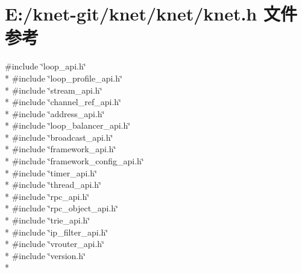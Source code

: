 \hypertarget{a00071}{}\section{E\+:/knet-\/git/knet/knet/knet.h 文件参考}
\label{a00071}
{\ttfamily \#include \char`\"{}loop\+\_\+api.\+h\char`\"{}}\\*
{\ttfamily \#include \char`\"{}loop\+\_\+profile\+\_\+api.\+h\char`\"{}}\\*
{\ttfamily \#include \char`\"{}stream\+\_\+api.\+h\char`\"{}}\\*
{\ttfamily \#include \char`\"{}channel\+\_\+ref\+\_\+api.\+h\char`\"{}}\\*
{\ttfamily \#include \char`\"{}address\+\_\+api.\+h\char`\"{}}\\*
{\ttfamily \#include \char`\"{}loop\+\_\+balancer\+\_\+api.\+h\char`\"{}}\\*
{\ttfamily \#include \char`\"{}broadcast\+\_\+api.\+h\char`\"{}}\\*
{\ttfamily \#include \char`\"{}framework\+\_\+api.\+h\char`\"{}}\\*
{\ttfamily \#include \char`\"{}framework\+\_\+config\+\_\+api.\+h\char`\"{}}\\*
{\ttfamily \#include \char`\"{}timer\+\_\+api.\+h\char`\"{}}\\*
{\ttfamily \#include \char`\"{}thread\+\_\+api.\+h\char`\"{}}\\*
{\ttfamily \#include \char`\"{}rpc\+\_\+api.\+h\char`\"{}}\\*
{\ttfamily \#include \char`\"{}rpc\+\_\+object\+\_\+api.\+h\char`\"{}}\\*
{\ttfamily \#include \char`\"{}trie\+\_\+api.\+h\char`\"{}}\\*
{\ttfamily \#include \char`\"{}ip\+\_\+filter\+\_\+api.\+h\char`\"{}}\\*
{\ttfamily \#include \char`\"{}vrouter\+\_\+api.\+h\char`\"{}}\\*
{\ttfamily \#include \char`\"{}version.\+h\char`\"{}}\\*
